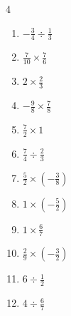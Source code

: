 \begin{multicols}{4}
\begin{enumerate}
  \item $\displaystyle -\frac{3}{4}\div{}\frac{1}{3}$


  \item $\displaystyle \frac{7}{10}\times{}\frac{7}{6}$


  \item $\displaystyle 2\times{}\frac{2}{3}$


  \item $\displaystyle -\frac{9}{8}\times{}\frac{7}{8}$


  \item $\displaystyle \frac{7}{2}\times{}1$


  \item $\displaystyle \frac{7}{4}\div{}\frac{2}{3}$


  \item $\displaystyle \frac{5}{2}\times{}\left(-\frac{3}{8}\right)$


  \item $\displaystyle 1\times{}\left(-\frac{5}{2}\right)$


\columnbreak %

  \item $\displaystyle 1\times{}\frac{6}{7}$


  \item $\displaystyle \frac{2}{9}\times{}\left(-\frac{3}{2}\right)$


  \item $\displaystyle 6\div{}\frac{1}{2}$

        \phantom{$\displaystyle =12$}

  \item $\displaystyle 4\div{}\frac{6}{7}$


\end{enumerate}
\end{multicols}
